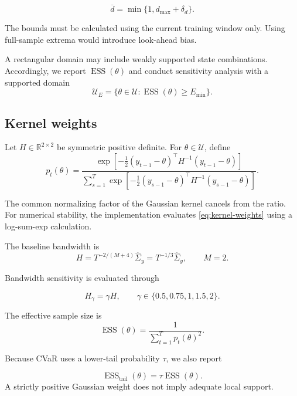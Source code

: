 \documentclass[11pt,a4paper]{article}
\theoremstyle{definition}
\theoremstyle{remark}
\newcommand{\R}{\mathbb{R}}
\newcommand{\U}{\mathcal{U}}
\newcommand{\ESS}{\operatorname{ESS}}
\begin{document}
\[
\overline d
=
\min\{1,d_{\max}+\delta_d\}.
\]

The bounds must be calculated using the current training window only. Using
full-sample extrema would introduce look-ahead bias.

A rectangular domain may include weakly supported state combinations.
Accordingly, we report \(\ESS(\theta)\) and conduct sensitivity analysis with
a supported domain
\begin{equation}
\U_E
=
\{\theta\in\U:\ESS(\theta)\ge E_{\min}\}.
\label{eq:supported-domain}
\end{equation}

\subsection{Kernel weights}

Let \(H\in\R^{2\times2}\) be symmetric positive definite. For
\(\theta\in\U\), define
\begin{equation}
p_t(\theta)
=
\frac{
\exp\!\left[
-\frac12(y_{t-1}-\theta)^\top H^{-1}(y_{t-1}-\theta)
\right]
}{
\sum_{s=1}^{T}
\exp\!\left[
-\frac12(y_{s-1}-\theta)^\top H^{-1}(y_{s-1}-\theta)
\right]
}.
\label{eq:kernel-weights}
\end{equation}

The common normalizing factor of the Gaussian kernel cancels from the ratio.
For numerical stability, the implementation evaluates
\eqref{eq:kernel-weights} using a log-sum-exp calculation.

The baseline bandwidth is
\begin{equation}
H
=
T^{-2/(M+4)}\widehat\Sigma_y
=
T^{-1/3}\widehat\Sigma_y,
\qquad M=2.
\label{eq:bandwidth}
\end{equation}

Bandwidth sensitivity is evaluated through

\[
H_\gamma=\gamma H,
\qquad
\gamma\in\{0.5,0.75,1,1.5,2\}.
\]

The effective sample size is
\begin{equation}
\ESS(\theta)
=
\frac{1}{\sum_{t=1}^{T}p_t(\theta)^2}.
\label{eq:ess}
\end{equation}

Because CVaR uses a lower-tail probability \(\tau\), we also report

\[
\ESS_{\mathrm{tail}}(\theta)=\tau\ESS(\theta).
\]
A strictly positive Gaussian weight does not imply adequate local support.

\end{document}

